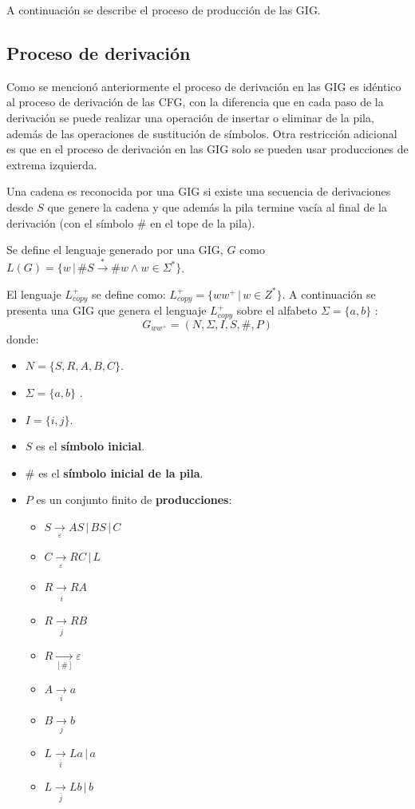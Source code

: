 \documentclass[12pt]{article}
\begin{document}
A continuación se describe el proceso de producción de las GIG.

\subsection{Proceso de derivación}

Como se mencionó anteriormente el proceso de derivación en las GIG es idéntico al proceso de derivación de las CFG, con la diferencia que
en cada paso de la derivación se puede realizar una operación de insertar o eliminar de la pila, además de las operaciones de sustitución de símbolos.
Otra restricción adicional es que en el proceso de derivación en las GIG solo se pueden usar producciones de extrema izquierda.

Una cadena es reconocida por una GIG si existe una secuencia de derivaciones desde $S$ que genere la cadena y que además la pila
termine vacía al final de la derivación (con el símbolo $\#$ en el tope de la pila).

Se define el lenguaje generado por una GIG, $G$
como $L(G)=\{w\,|\,\#S\overset{*}{\to}\#w \wedge w\in \Sigma^* \}$.

El lenguaje $L_{copy}^+$ se define como: $L_{copy}^+=\{ww^+\,|\,w\in Z^*\}$. A continuación se presenta una GIG que genera el lenguaje $L_{copy}^+$ sobre el alfabeto $\Sigma=\{a,b\}$ \cite{globalIndexLanguages}:
$$
    G_{ww^+} = (N, \Sigma, I, S, \#, P)
$$
donde:

\begin{itemize}
    \item $N= \{S,R,A,B,C\}$.
    \item \( \Sigma=\{a,b\} \) .
    \item $I=\{i,j\}$.
    \item $S$ es el \textbf{símbolo inicial}.
    \item $\#$ es el \textbf{símbolo inicial de la pila}.
    \item $P$ es un conjunto finito de \textbf{producciones}:
          \begin{multicols}{2}
              \begin{itemize}
                  \item $S\underset{\varepsilon}{\to} AS\,|\,BS\,|\,C$
                  \item $C\underset{\varepsilon}{\to} RC\,|\,L$
                  \item $R\underset{\overline{i}}{\to} RA$
                  \item $R\underset{\overline{j}}{\to} RB$
                  \item $R\underset{[\#]}{\to} \varepsilon$
                  \item $A\underset{i}{\to} a$
                  \item $B\underset{j}{\to} b$
                  \item $L\underset{\overline{i}}{\to} La\,|\,a$
                  \item $L\underset{\overline{j}}{\to} Lb\,|\,b$
              \end{itemize}
          \end{multicols}
\end{itemize}
\end{document}
